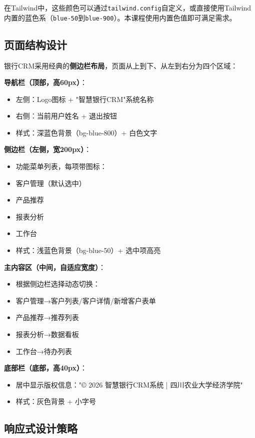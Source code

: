 在Tailwind中，这些颜色可以通过\texttt{tailwind.config}自定义，或直接使用Tailwind内置的蓝色系（\texttt{blue-50}到\texttt{blue-900}）。本课程使用内置色值即可满足需求。

\subsection{页面结构设计}

银行CRM采用经典的\textbf{侧边栏布局}，页面从上到下、从左到右分为四个区域：

\textbf{导航栏（顶部，高60px）}：
\begin{itemize}[leftmargin=2em]
  \item 左侧：Logo图标 + "智慧银行CRM"系统名称
  \item 右侧：当前用户姓名 + 退出按钮
  \item 样式：深蓝色背景（bg-blue-800）+ 白色文字
\end{itemize}

\textbf{侧边栏（左侧，宽200px）}：
\begin{itemize}[leftmargin=2em]
  \item 功能菜单列表，每项带图标：
  \item 客户管理（默认选中）
  \item 产品推荐
  \item 报表分析
  \item 工作台
  \item 样式：浅蓝色背景（bg-blue-50）+ 选中项高亮
\end{itemize}

\textbf{主内容区（中间，自适应宽度）}：
\begin{itemize}[leftmargin=2em]
  \item 根据侧边栏选择动态切换：
  \item 客户管理→客户列表/客户详情/新增客户表单
  \item 产品推荐→推荐列表
  \item 报表分析→数据看板
  \item 工作台→待办列表
\end{itemize}

\textbf{底部栏（底部，高40px）}：
\begin{itemize}[leftmargin=2em]
  \item 居中显示版权信息："© 2026 智慧银行CRM系统 | 四川农业大学经济学院"
  \item 样式：灰色背景 + 小字号
\end{itemize}

\subsection{响应式设计策略}

